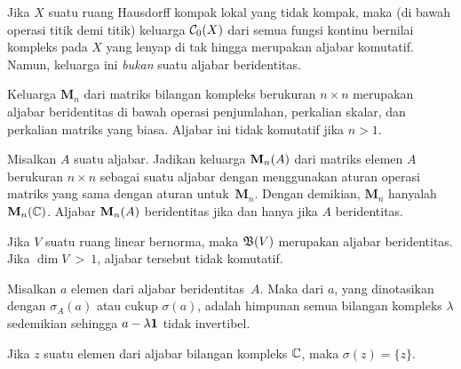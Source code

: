 \begin{exam} Jika $X$ suatu ruang Hausdorff kompak lokal yang tidak kompak, maka (di bawah
operasi titik demi titik) keluarga $\mathcal{C}_0(X)$ dari semua fungsi kontinu bernilai kompleks
pada $X$ yang lenyap di tak hingga merupakan aljabar komutatif.
Namun, keluarga ini \emph{bukan} suatu
aljabar beridentitas.
\end{exam}

\begin{exam}\label{000533} Keluarga
$\mathbf M_n$ dari matriks bilangan kompleks berukuran $n \times n$ merupakan
aljabar beridentitas di bawah operasi penjumlahan, perkalian skalar, dan perkalian matriks yang biasa.
Aljabar ini tidak komutatif jika $n > 1$.
\end{exam}

\begin{exam}\label{000533a} Misalkan $A$ suatu aljabar. Jadikan keluarga
$\mathbf{M}_{n}({A})$ dari matriks elemen $A$ berukuran $n \times n$ sebagai suatu
aljabar dengan menggunakan aturan operasi matriks yang sama dengan aturan untuk~$\mathbf M_n$.
Dengan demikian, $\mathbf M_n$ hanyalah $\mathbf{M}_{n}({\mathbb{C}})$. Aljabar $\mathbf{M}_{n}({A})$ beridentitas jika dan hanya jika $A$ beridentitas.
\end{exam}

\begin{exam}\label{000534} Jika $V$ suatu ruang linear bernorma, maka
$\mathfrak{B}(V)$ merupakan aljabar beridentitas. Jika $\dim V~>~1$, aljabar tersebut tidak komutatif.
\end{exam}

\begin{defn}\label{000535} Misalkan $a$ elemen dari aljabar beridentitas~$A$. Maka
 dari $a$, yang dinotasikan dengan
$\sigma_A(a)$ atau cukup $\sigma(a)$, adalah himpunan semua bilangan kompleks $\lambda$ sedemikian sehingga
$a - \lambda\mathbf{1}$ tidak invertibel.
\end{defn}

\begin{exam} Jika $z$ suatu elemen dari aljabar bilangan kompleks $\mathbb{C}$, maka
$\sigma(z) = \{z\}$.
\end{exam}

